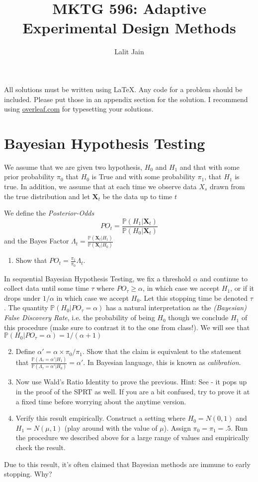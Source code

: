 \documentclass[11pt]{article}
\title{MKTG 596: Adaptive Experimental Design Methods}
\author{Lalit Jain}
\renewcommand{\P}{\mathbb{P}}
\newcommand{\mb}[1]{\mathbf{#1}}
\newcommand{\1}[1]{\mathbf{1}\left\{#1\right\}}
\begin{document}
\maketitle

All solutions must be written using \LaTeX. Any code for a problem should be included. Please put those in an appendix section for the solution. I recommend using \href{Overlead}{overleaf.com} for typesetting your solutions. 

\section{Bayesian Hypothesis Testing}

We assume that we are given two hypothesis, $H_0$ and $H_1$ and that with some prior probability $\pi_0$ that $H_0$ is True and with some probability $\pi_1$, that $H_1$ is true. In addition, we assume that at each time we observe data $X_s$ drawn from the true distribution and let $\mathbf{X}_t$ be the data up to time $t$ 

We define the \textit{Posterior-Odds}
\[PO_t = \frac{\P(H_1|\mb{X}_t)}{\P(H_0|\mb{X}_t)}\]
and the Bayes Factor $\Lambda_t = \frac{\P(\mb{X}_t|H_1)}{\P(\mb{X}_t|H_0)}$
\begin{enumerate}
    \item Show that $PO_t = \frac{\pi_1}{\pi_0}\Lambda_t$.
\end{enumerate}


In sequential Bayesian Hypothesis Testing, we fix a threshold $\alpha$ and continue to collect data until some time $\tau$ where $PO_{\tau} \geq \alpha$, in which case we accept $H_1$, or if it drops under $1/\alpha$ in which case we accept $H_0$. Let this stopping time be denoted $\tau$. The quantity $\P(H_0|PO_{\tau} = \alpha)$ has a natural interpretation as the \textit{(Bayesian) False Discovery Rate}, i.e. the probability of being $H_0$ though we conclude $H_1$ of this procedure (make sure to contrast it to the one from class!). We will see that $\P(H_0|PO_{\tau} = \alpha) = 1/(\alpha + 1)$ 
\begin{enumerate}
    \setcounter{enumi}{1}
    \item Define $\alpha' = \alpha \times \pi_0/\pi_1$. Show that the claim is equivalent to the statement that $\frac{\P(\Lambda_{\tau} = \alpha'|H_1)}{\P(\Lambda_{\tau} = \alpha'|H_0)} = \alpha'$. In Bayesian language, this is known as \textit{calibration}.
    \item Now use Wald's Ratio Identity to prove the previous. Hint: See \cite{tartakovsky2014sequential} - it pops up in the proof of the SPRT as well.  If you are a bit confused, try to prove it at a fixed time before worrying about the anytime version.
    \item Verify this result empirically. Construct a setting where $H_0 = N(0,1)$ and $H_1 = N(\mu, 1)$ (play around with the value of $\mu$). Assign $\pi_0 = \pi_1 = .5$. Run the procedure we described above for a large range of values and empirically check the result.
\end{enumerate}
Due to this result, it's often claimed that Bayesian methods are immune to early stopping. Why?
\end{document}
